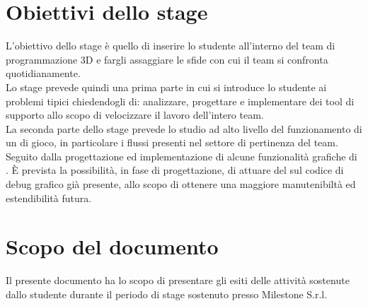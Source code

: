 \section{Obiettivi dello stage}

L'obiettivo dello stage è quello di inserire lo studente all'interno del team di programmazione 3D e fargli assaggiare le sfide con cui il team si confronta quotidianamente.\\

Lo stage prevede quindi una prima parte in cui si introduce lo studente ai problemi tipici chiedendogli di: analizzare, progettare e implementare dei tool di supporto allo scopo di velocizzare il lavoro dell'intero team.\\

La seconda parte dello stage prevede lo studio ad alto livello del funzionamento di un  di gioco, in particolare i flussi presenti nel settore di pertinenza del team. Seguito dalla progettazione ed implementazione di alcune funzionalità grafiche di . È prevista la possibilità, in fase di progettazione, di attuare del  sul codice di debug grafico già presente, allo scopo di ottenere una maggiore manutenibiltà ed estendibilità futura.

\section{Scopo del documento}

Il presente documento ha lo scopo di presentare gli esiti delle attività sostenute dallo studente durante il periodo di stage sostenuto presso Milestone S.r.l.\\

